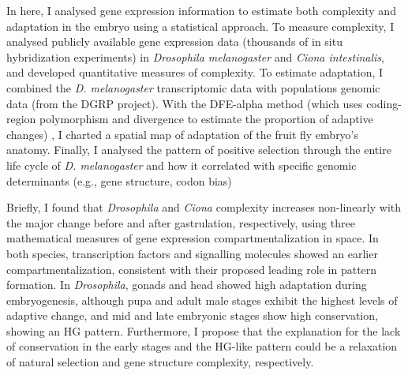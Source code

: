 \hfill\break 
In here, I analysed gene expression information to estimate both complexity and adaptation in the embryo using a statistical approach.
%
To measure complexity, I analysed publicly available gene expression data (thousands of in situ hybridization experiments)%
 in \textit{Drosophila melanogaster} and \textit{Ciona intestinalis}, and developed quantitative measures of complexity.
%
To estimate adaptation, I combined the \textit{D. melanogaster} transcriptomic data with populations genomic data (from the DGRP project). With the DFE-alpha method 
(which uses coding-region polymorphism and divergence to estimate the proportion of adaptive changes)
, I charted a spatial map of adaptation of the fruit fly embryo's anatomy. 
Finally, I analysed the pattern of positive selection through the entire life cycle of \textit{D. melanogaster} and how it correlated with specific genomic determinants (e.g., gene structure, codon bias)

\hfill\break 
Briefly, I found that \textit{Drosophila} and \textit{Ciona} complexity increases non-linearly with the major change before and after gastrulation, respectively, using three mathematical measures of gene expression compartmentalization in space. 
In both species, transcription factors and signalling molecules showed an earlier compartmentalization, consistent with their proposed leading role in pattern formation.
%
In \textit{Drosophila}, gonads and head showed high adaptation during embryogenesis, although pupa and adult male stages exhibit the highest levels of adaptive change, and mid and late embryonic stages show high conservation, showing an HG pattern.
Furthermore, I propose that the explanation for the lack of conservation in the early stages and the HG-like pattern could be a relaxation of natural selection and gene structure complexity, respectively.